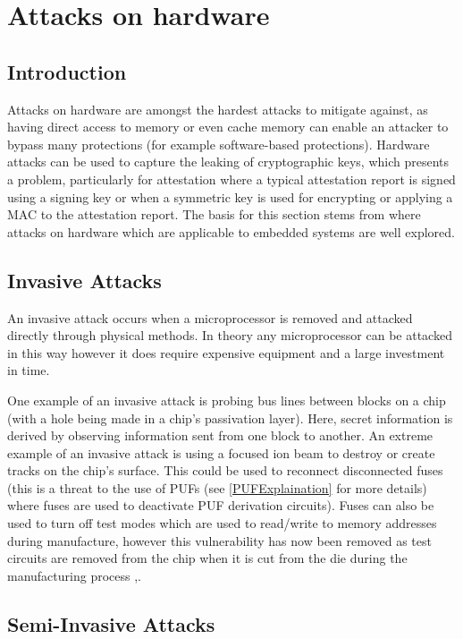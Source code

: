 \section{Attacks on hardware} \label{hardwareAttacks}
\subsection{Introduction}

Attacks on hardware are amongst the hardest attacks to mitigate against, as having direct access to memory or even cache memory can enable an attacker to bypass many protections (for example software-based protections). Hardware attacks can be used to capture the leaking of cryptographic keys, which presents a problem, particularly for attestation where a typical attestation report is signed using a signing key or when a symmetric key is used for encrypting or applying a MAC to the attestation report. The basis for this section stems from \cite{MayesKeithE2008SCTS} where attacks on hardware which are applicable to embedded systems are well explored.

\subsection{Invasive Attacks}
An invasive attack occurs when a microprocessor is removed and attacked directly through physical methods. In theory any microprocessor can be attacked in this way however it does require expensive equipment and a large investment in time.

One example of an invasive attack is probing bus lines between blocks on a chip (with a hole being made in a chip's passivation layer). Here, secret information is derived by observing information sent from one block to another. An extreme example of an invasive attack is using a focused ion beam to destroy or create tracks on the chip's surface. This could be used to reconnect disconnected fuses (this is a threat to the use of PUFs (see \ref{PUFExplaination} for more details) where fuses are used to deactivate PUF derivation circuits). Fuses can also be used to turn off test modes which are used to read\slash write to memory addresses during manufacture, however this vulnerability has now been removed as test circuits are  removed from the chip when it is cut from the die during the manufacturing process \cite{Anderson1996},\cite{Kommerling1999}.

\subsection{Semi-Invasive Attacks}

